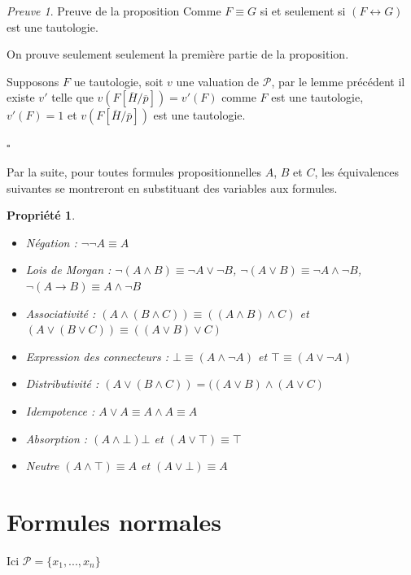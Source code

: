 \documentclass[]{article}
\newtheorem{myproperty}{Propriété}
\theoremstyle{remark}
\newtheorem{myproof}{Preuve}
\theoremstyle{definition}
\newcommand{\cqfd}{
	\hfill$\square$
}
\begin{document}
\begin{myproof}Preuve de la proposition
	Comme $F \equiv G$ si et seulement si $(F \longleftrightarrow G)$ est une tautologie.
	
	On prouve seulement seulement la première partie de la proposition.
	
	Supposons $F$ ue tautologie, soit $v$ une valuation de $\mathcal{P}$, par le lemme précédent il existe $v'$ telle que $v(F[\overline{H}/\overline{p}])=v'(F)$ comme $F$ est une tautologie, $v'(F)=1$ et $v(F[\overline{H}/\overline{p}])$ est une tautologie.
	
	\cqfd
\end{myproof}

Par la suite, pour toutes formules propositionnelles $A$, $B$ et $C$, les équivalences suivantes se montreront en substituant des variables aux formules.

\begin{myproperty}
	\leavevmode
	\begin{itemize}
		\item Négation : $\neg\neg A \equiv A$
		\item Lois de Morgan : $\neg(A \land B) \equiv \neg A \lor \neg B$, $\neg(A \lor B) \equiv \neg A \land \neg B$, $\neg (A \longrightarrow B) \equiv A \land \neg B$
		\item Associativité : $(A \land (B \land C)) \equiv ((A \land B) \land C
		)$ et $(A \lor (B \lor C)) \equiv ((A \lor B) \lor C
				)$
				
		\item Expression des connecteurs : $\bot \equiv (A \land \neg A)$ et $\top \equiv (A \lor \neg A)$
		
		\item Distributivité : $(A\lor (B \land C)) = ((A \lor B) \land (A \lor C)$
		\item Idempotence : $A \lor A \equiv  A \land A \equiv A$
		\item Absorption : $(A \land \bot) \bot$ et $(A \lor \top) \equiv \top$
		\item Neutre $(A \land \top) \equiv A$ et $(A \lor \bot) \equiv A$
	\end{itemize}
\end{myproperty}

\section{Formules normales}

Ici $\mathcal{P}=\{x_1, ..., x_n\}$
\end{document}
